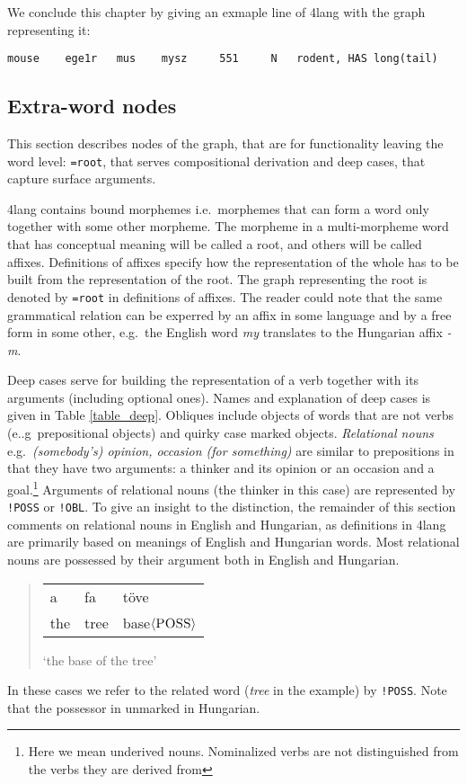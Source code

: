 \documentclass[a4paper,10pt]{article}
\begin{document}
We conclude this chapter by giving an exmaple line of 4lang with the graph representing it:

\begin{verbatim}
mouse	 ege1r	 mus	mysz	 551	 N	 rodent, HAS long(tail)
\end{verbatim}
\subsection{Extra-word nodes}\label{sec_extraword}
This section describes nodes of the graph, that are for functionality leaving the word level: \texttt{=root}, that serves compositional derivation and deep cases, that capture surface arguments.

4lang contains bound morphemes i.e.\ morphemes that can form a word only together with some other morpheme. The morpheme in a multi-morpheme word that has conceptual meaning will be called a root, and others will be called affixes. Definitions of affixes specify how the representation of the whole has to be built from the representation of the root. The graph representing the root is denoted by \texttt{=root} in definitions of affixes. The reader could note that the same grammatical relation can be experred by an affix in some language and by a free form in some other, e.g.\ the English word \emph{my} translates to the Hungarian affix \emph{-m}. %

Deep cases serve for building the representation of a verb together with its arguments (including optional ones). Names and explanation of deep cases is given in Table \ref{table_deep}.
Obliques include objects of words that are not verbs (e..g\ prepositional objects) and quirky case marked objects. %
\emph{Relational nouns} e.g.\ \emph{(somebody's) opinion, occasion (for something)} are similar to prepositions in that they have two arguments: a thinker and its opinion or an occasion and a goal.\footnote{Here we mean underived nouns. Nominalized verbs are not distinguished from the verbs they are derived from} Arguments of relational nouns (the thinker in this case) are represented by \texttt{!POSS} or \texttt{!OBL}. To give an insight to the distinction, the remainder of this section comments on relational nouns in English and Hungarian, as definitions in 4lang are primarily based on meanings of English and Hungarian words. Most {relational nouns} are possessed by their argument both in English and Hungarian. 
\begin{quote}
 \begin{tabular}{lll}
  a &fa &töve
 \\the &tree &base$\langle\textsc{POSS}\rangle$
 \end{tabular}
 
 `the base of the tree'
\end{quote}
In these cases we refer to the related word (\emph{tree} in the example) by \texttt{!POSS}. Note that the possessor in unmarked in Hungarian.
 
\end{document}
